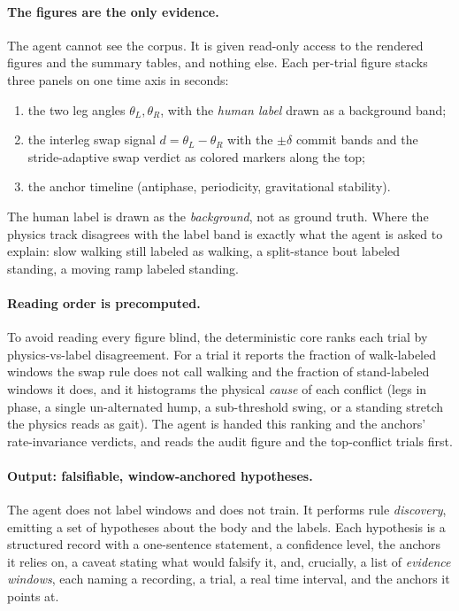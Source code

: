 \documentclass[11pt]{article}
\newcommand{\Lang}{\theta_{L}}          %
\newcommand{\Rang}{\theta_{R}}          %
\newcommand{\ileg}{d}                   %
\begin{document}
\paragraph{The figures are the only evidence.} The agent cannot see the corpus. It is
given read-only access to the rendered figures and the summary tables, and nothing
else. Each per-trial figure stacks three panels on one time axis in seconds:
\begin{enumerate}[leftmargin=2em, itemsep=2pt]
  \item the two leg angles $\Lang, \Rang$, with the \emph{human label} drawn as a
        background band;
  \item the interleg swap signal $\ileg = \Lang - \Rang$ with the $\pm\delta$ commit
        bands and the stride-adaptive swap verdict as colored markers along the top;
  \item the anchor timeline (antiphase, periodicity, gravitational stability).
\end{enumerate}
The human label is drawn as the \emph{background}, not as ground truth. Where the
physics track disagrees with the label band is exactly what the agent is asked to
explain: slow walking still labeled as walking, a split-stance bout labeled standing,
a moving ramp labeled standing.

\paragraph{Reading order is precomputed.} To avoid reading every figure blind, the
deterministic core ranks each trial by physics-vs-label disagreement. For a trial it
reports the fraction of walk-labeled windows the swap rule does not call walking and
the fraction of stand-labeled windows it does, and it histograms the physical
\emph{cause} of each conflict (legs in phase, a single un-alternated hump, a
sub-threshold swing, or a standing stretch the physics reads as gait). The agent is
handed this ranking and the anchors' rate-invariance verdicts, and reads the audit
figure and the top-conflict trials first.

\paragraph{Output: falsifiable, window-anchored hypotheses.} The agent does not label
windows and does not train. It performs rule \emph{discovery}, emitting a set of
hypotheses about the body and the labels. Each hypothesis is a structured record with
a one-sentence statement, a confidence level, the anchors it relies on, a caveat
stating what would falsify it, and, crucially, a list of \emph{evidence windows}, each
naming a recording, a trial, a real time interval, and the anchors it points at.
\end{document}
